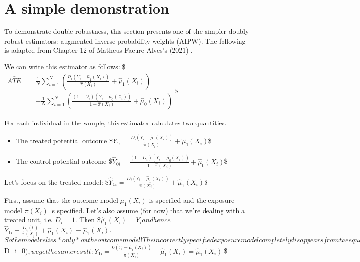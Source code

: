 \documentclass[letterpaper,10pt,english]{jupyterBook}
\begin{document}
\section{A simple demonstration}
\label{\detokenize{Introduction and Conceptual Overview:a-simple-demonstration}}
\sphinxAtStartPar
To demonstrate double robustness, this section presents one of the simpler doubly robust estimators: augmented inverse probability weights (AIPW). The following is adapted from Chapter 12 of Matheus Facure Alves’s (2021) .

\sphinxAtStartPar
We can write this estimator as follows:
\$\(\begin{aligned}
\widehat{ATE} = &\frac{1}{N} \sum_{i=1}^N \left( \frac{D_i(Y_i - \hat \mu_1 (X_i))}{\hat \pi (X_i)} + \hat \mu_1(X_i) \right) \\
&- \frac{1}{N} \sum_{i=1}^N \left( \frac{(1-D_i)(Y_i - \hat \mu_0 (X_i))}{1-\hat \pi(X_i)} + \hat \mu_0(X_i) \right)
\end{aligned}\)\$

\sphinxAtStartPar
For each individual in the sample, this estimator calculates two quantities:
\begin{itemize}
\item {} 
\sphinxAtStartPar
The treated potential outcome
\$\(\hat Y_{1i} = \frac{D_i(Y_i - \hat \mu_1 (X_i))}{\hat \pi (X_i)} + \hat \mu_1(X_i)\)\$

\item {} 
\sphinxAtStartPar
The control potential outcome
\$\(\hat Y_{0i} = \frac{(1-D_i)(Y_i - \hat \mu_0 (X_i))}{1-\hat \pi(X_i)} + \hat \mu_0(X_i)\)\$

\end{itemize}

\sphinxAtStartPar
Let’s focus on the treated model:
\$\(\hat Y_{1i} = \frac{D_i(Y_i - \hat \mu_1 (X_i))}{\hat \pi (X_i)} + \hat \mu_1(X_i)\)\$

\sphinxAtStartPar
First, assume that the outcome model \(\mu_1(X_i)\) is  specified and the exposure model \(\pi(X_i)\) is  specified. Let’s also assume (for now) that we’re dealing with a treated unit, i.e. \(D_i = 1\). Then
\$\(\hat \mu_1 (X_i) = Y_i\)\(
and hence
\)\(\hat Y_{1i} = \frac{D_i(0)}{\hat \pi (X_i)} + \hat \mu_1(X_i) = \hat \mu_1(X_i).\)\(
So the model relies *only* on the outcome model! The incorrectly specified exposure model completely disappears from the equation. If we're dealing with a control unit (\)D\_i=0\(), we get the same result:
\)\(\hat Y_{1i} = \frac{0(Y_i - \hat \mu_1 (X_i))}{\hat \pi (X_i)} + \hat \mu_1(X_i) = \hat \mu_1(X_i).\)\$
\end{document}
